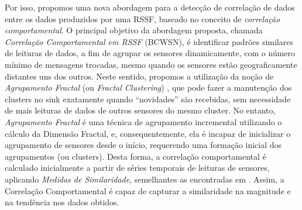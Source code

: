 \documentclass{acm_proc_article-sp}
\begin{document}
Por isso, propomos uma nova abordagem para a detecção de correlação de dados
entre os dados produzidos por uma RSSF, baseado no conceito de {\it correlação
comportamental}. O principal objetivo da abordagem proposta, chamada {\it
Correlação Comportamental em RSSF} (BCWSN), é identificar padrões similares de
leituras de dados, a fim de agrupar os sensores dinamicamente, com o número
mínimo de mensagens trocadas, mesmo quando os sensores estão geograficamente
distantes uns dos outros. Neste sentido, propomos a utilização da noção de {\it
Agrupamento Fractal} (ou {\it Fractal Clustering}) \cite{Barbara2000}, que pode
fazer a manutenção dos clusters no sink exatamente quando ``novidades'' são
recebidas, sem necessidade de mais leituras de dados de outros sensores do mesmo
cluster.
No entanto, {\it Agrupamento Fractal} é uma técnica de agrupamento incremental
utilizando o cálculo da Dimensão Fractal, e, consequentemente, ela é incapaz de
inicializar o agrupamento de sensores desde o início, requerendo uma formação
inicial dos agrupamentos (ou clusters). Desta forma, a correlação comportamental
é calculado inicialmente a partir de séries temporais de leituras de sensores,
aplicando {\it Medidas de Similaridade}, semelhantes as encontradas em
\cite{Liu2007}. Assim, a Correlação Comportamental é capaz de capturar a
similaridade na magnitude e na tendência nos dados obtidos.
\vspace*{-.3cm}
\end{document}

